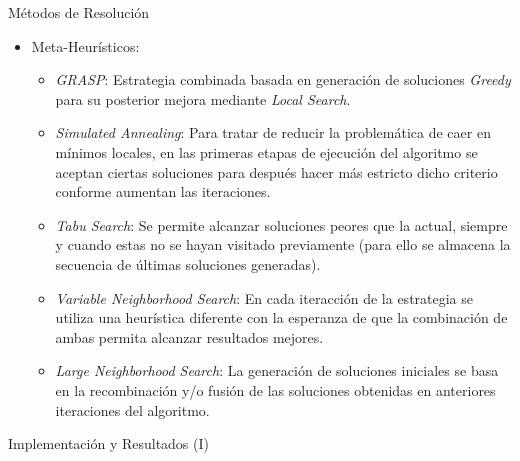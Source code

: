 \documentclass[8pt]{beamer}
\begin{document}
  \begin{frame}{Métodos de Resolución}
    \begin{itemize}
      \item Meta-Heurísticos:
        \begin{itemize}
          \item \emph{GRASP}: Estrategia combinada basada en generación de soluciones \emph{Greedy} para su posterior mejora mediante \emph{Local Search}.
          \item \emph{Simulated Annealing}: Para tratar de reducir la problemática de caer en mínimos locales, en las primeras etapas de ejecución del algoritmo se aceptan ciertas soluciones  para después hacer más estricto dicho criterio conforme aumentan las iteraciones.
          \item \emph{Tabu Search}: Se permite alcanzar soluciones peores que la actual, siempre y cuando estas no se hayan visitado previamente (para ello se almacena la secuencia de últimas soluciones generadas).
          \item \emph{Variable Neighborhood Search}: En cada iteracción de la estrategia se utiliza una heurística diferente con la esperanza de que la combinación de ambas permita alcanzar resultados mejores.
          \item \emph{Large Neighborhood Search}: La generación de soluciones iniciales se basa en la recombinación y/o fusión de las soluciones obtenidas en anteriores iteraciones del algoritmo.
        \end{itemize}
    \end{itemize}
  \end{frame}

  \begin{frame}{Implementación y Resultados (I)}
    \begin{figure}[!hb]
      \centering
      \inputminted[frame=single]{python}{./code/minimal_solve.py}
    \end{figure}
  \end{frame}
\end{document}
